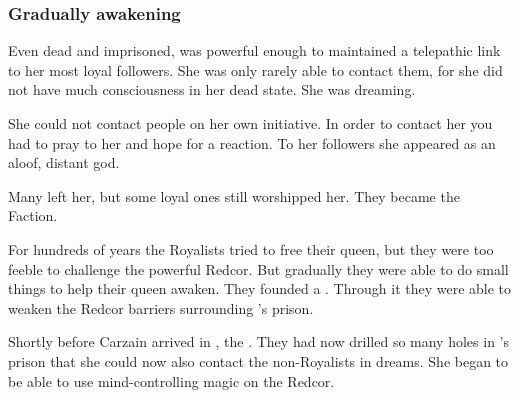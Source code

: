 




\subsubsection{Gradually awakening}
Even dead and imprisoned, \Belzir was powerful enough to maintained a telepathic link to her most loyal followers. 
She was only rarely able to contact them, for she did not have much consciousness in her dead state. 
She was dreaming.

She could not contact people on her own initiative. 
In order to contact her you had to pray to her and hope for a reaction. 
To her followers she appeared as an aloof, distant god. 

Many left her, but some loyal ones still worshipped her. 
They became the  Faction. 

For hundreds of years the Royalists tried to free their queen, but they were too feeble to challenge the powerful Redcor. 
But gradually they were able to do small things to help their queen awaken. 
They founded a . 
Through it they were able to weaken the Redcor barriers surrounding \Belzir's prison.

Shortly before Carzain \Shachar arrived in \Redce, the . 
They had now drilled so many holes in \Belzir's prison that she could now also contact the non-Royalists in dreams.
She began to be able to use mind-controlling magic on the Redcor. 


